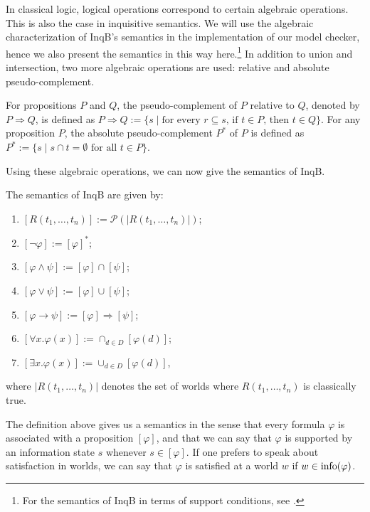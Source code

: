 In classical logic, logical operations correspond to certain algebraic operations. This is also the case in inquisitive semantics. We will use the algebraic characterization of \textsf{InqB}'s semantics in the implementation of our model checker, hence we also present the semantics in this way here.\footnote{For the semantics of \textsf{InqB} in terms of support conditions, see \cite[p.\ 62-63]{inquisitive19}.} In addition to union and intersection, two more algebraic operations are used: relative and absolute pseudo-complement.

\begin{defi}\label{defpseudo}
 For propositions $P$ and $Q$, the pseudo-complement of $P$ relative to $Q$, denoted by $P\Rightarrow Q$, is defined as $P\Rightarrow Q:= \{s \mid \text{for every } r\subseteq s\text{, if } t\in P\text{, then } t\in Q\}$. For any proposition $P$, the absolute pseudo-complement $P^*$ of $P$ is defined as $P^*:=\{s\mid s\cap t=\emptyset \text{ for all } t\in P\}$.
\end{defi}
Using these algebraic operations, we can now give the semantics of \textsf{InqB}.

\begin{defi}\label{defsemantics}
 The semantics of \textsf{InqB} are given by:
 \begin{enumerate}\setlength\itemsep{-0.3em}
     \item $[R(t_1,\dots,t_n)] := \mathcal{P}(|R(t_1,\dots,t_n)|)$;
     \item $[\neg \varphi]:=[\varphi]^*$;
     \item $[\varphi\land\psi]:=[\varphi]\cap [\psi]$;
     \item $[\varphi\lor\psi]:=[\varphi]\cup [\psi]$;
     \item $[\varphi\rightarrow\psi]:=[\varphi]\Rightarrow [\psi]$;
     \item $[\forall x . \varphi(x)]:= \cap_{d\in D} [\varphi(d)]$;
     \item $[\exists x . \varphi(x)]:= \cup_{d\in D} [\varphi(d)]$,
 \end{enumerate}
 where $|R(t_1,\dots,t_n)|$ denotes the set of worlds where $R(t_1,\dots,t_n)$ is classically true.
\end{defi}

The definition above gives us a semantics in the sense that every formula $\varphi$ is associated with a proposition $[\varphi]$, and that we can say that $\varphi$ is supported by an information state $s$ whenever $s\in [\varphi]$. If one prefers to speak about satisfaction in worlds, we can say that $\varphi$ is satisfied at a world $w$ if $w\in \textrm{info}(\varphi)$.

